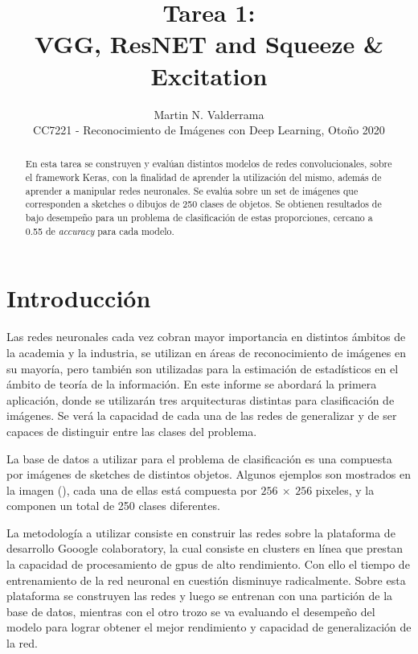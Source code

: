 
	\title{Tarea 1:\\VGG, ResNET and Squeeze \& Excitation}
	\author{Martin N. Valderrama\\ CC7221 - Reconocimiento de Imágenes con Deep Learning, Otoño 2020\\}
	\maketitle

\begin{abstract}

    En esta tarea se construyen y evalúan distintos modelos de redes convolucionales, sobre el framework Keras, con la finalidad de aprender la utilización del mismo, además de aprender a manipular redes neuronales. Se evalúa sobre un set de imágenes que corresponden a sketches o dibujos de 250 clases de objetos. Se obtienen resultados de bajo desempeño para un problema de clasificación de estas proporciones, cercano a 0.55 de \textit{accuracy} para cada modelo.
    
\end{abstract}

\section{Introducción}

    Las redes neuronales cada vez cobran mayor importancia en distintos ámbitos de la academia y la industria, se utilizan en áreas de reconocimiento de imágenes en su mayoría, pero también son utilizadas para la estimación de estadísticos en el ámbito de teoría de la información. En este informe se abordará la primera aplicación, donde se utilizarán tres arquitecturas distintas para clasificación de imágenes. Se verá la capacidad de cada una de las redes de generalizar y de ser capaces de distinguir entre las clases del problema.
    
    La base de datos a utilizar para el problema de clasificación es una compuesta por imágenes de sketches de distintos objetos. Algunos ejemplos son mostrados en la imagen (), cada una de ellas está compuesta por $256 \ \times \ 256$ pixeles, y la componen un total de 250 clases diferentes.
    
    La metodología a utilizar consiste en construir las redes sobre la plataforma de desarrollo Gooogle colaboratory, la cual consiste en clusters en línea que prestan la capacidad de procesamiento de gpus de alto rendimiento. Con ello el tiempo de entrenamiento de la red neuronal en cuestión disminuye radicalmente. Sobre esta plataforma se construyen las redes y luego se entrenan con una partición de la base de datos, mientras con el otro trozo se va evaluando el desempeño del modelo para lograr obtener el mejor rendimiento y capacidad de generalización de la red.
    

